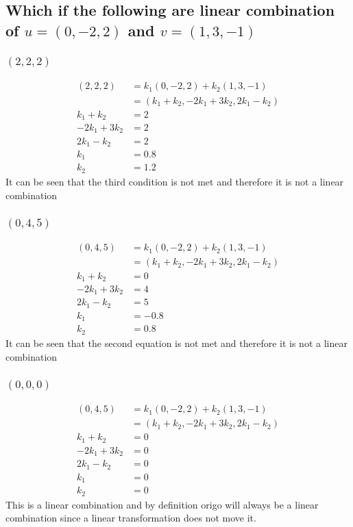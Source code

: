 \documentclass[12pt, a4paper]{article}
\begin{document}
		\subsection{Which if the following are linear combination of $u=(0,-2,2)$ and $v=(1,3,-1)$}
			\subsubsection{$(2,2,2)$}
				\begin{align*}
					(2,2,2)&=k_1(0,-2,2)+k_2(1,3,-1)\\
					&=(k_1+k_2,-2k_1+3k_2,2k_1-k_2)\\[4mm]
					k_1+k_2&=2\\
					-2k_1+3k_2&=2\\
					2k_1-k_2&=2\\[4mm]
					k_1&=0.8\\
					k_2&=1.2
				\end{align*}
				It can be seen that the third condition is not met and therefore it is not a linear combination
			\subsubsection{$(0,4,5)$}
				\begin{align*}
					(0,4,5)&=k_1(0,-2,2)+k_2(1,3,-1)\\
					&=(k_1+k_2,-2k_1+3k_2,2k_1-k_2)\\[4mm]
					k_1+k_2&=0\\
					-2k_1+3k_2&=4\\
					2k_1-k_2&=5\\[4mm]
					k_1&=-0.8\\
					k_2&=0.8
				\end{align*}
				It can be seen that the second equation is not met and therefore it is not a linear combination
			\subsubsection{$(0,0,0)$}
				\begin{align*}
					(0,4,5)&=k_1(0,-2,2)+k_2(1,3,-1)\\
					&=(k_1+k_2,-2k_1+3k_2,2k_1-k_2)\\[4mm]
					k_1+k_2&=0\\
					-2k_1+3k_2&=0\\
					2k_1-k_2&=0\\[4mm]
					k_1&=0\\
					k_2&=0
				\end{align*}
				This is a linear combination and by definition origo will always be a linear combination since a linear transformation does not move it.
\end{document}
